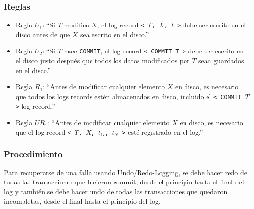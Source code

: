 \subsubsection{Reglas}
\begin{itemize}
  \item Regla $U_1$: ``Si $T$ modifica $X$, el log record \texttt{<\ $T$, $X$, $t$ >} debe ser escrito en el disco antes de que $X$ sea escrito en el disco.''
  \item Regla $U_2$: ``Si $T$ hace \texttt{COMMIT}, el log record \texttt{< COMMIT T >} debe ser escrito en el disco justo después que todos los datos modificados por $T$ sean guardados en el disco.''
  \item Regla $R_1$: ``Antes de modificar cualquier elemento $X$ en disco, es necesario que todos los logs records est\'en almacenados en disco, incluido el \texttt{< COMMIT $T$ >} log record.''
  \item Regla $UR_1$: ``Antes de modificar cualquier elemento $X$ en disco, es necesario que el log record \texttt{<\ $T$, $X$, $t_O$, $t_N$ >} est\'e registrado en el log.''
\end{itemize}


\subsubsection{Procedimiento}
Para recuperarse de una falla usando Undo/Redo-Logging, se debe hacer redo de todas las transacciones que hicieron commit, desde el principio hasta el final del log y tambi\'en se debe hacer undo de todas las transacciones que quedaron incompletas, desde el final hasta el principio del log.



